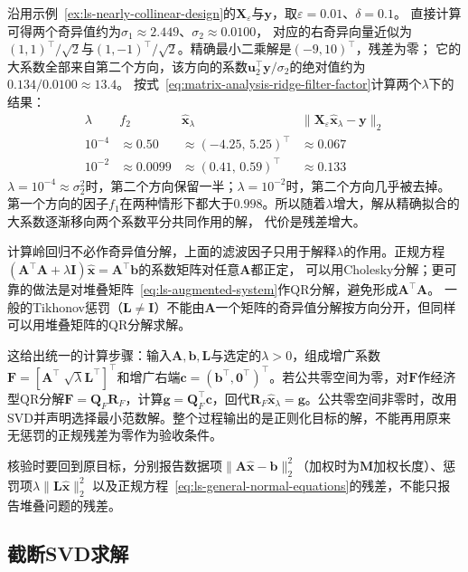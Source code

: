 \begin{example}[近共线设计上的岭回归]
\label{ex:ls-ridge-nearly-collinear}
沿用示例~\ref{ex:ls-nearly-collinear-design}的$\bm X_\varepsilon$与$\bm y$，取$\varepsilon=0.01$、$\delta=0.1$。
直接计算可得两个奇异值约为$\sigma_1\approx2.449$、$\sigma_2\approx0.0100$，
对应的右奇异向量近似为$(1,1)^\top/\sqrt2$与$(1,-1)^\top/\sqrt2$。精确最小二乘解是$(-9,10)^\top$，残差为零；
它的大系数全部来自第二个方向，该方向的系数$\bm u_2^\top\bm y/\sigma_2$的绝对值约为$0.134/0.0100\approx13.4$。
按式~\eqref{eq:matrix-analysis-ridge-filter-factor}计算两个$\lambda$下的结果：
\[
 \begin{array}{cccc}
  \lambda & f_2 & \hat{\bm x}_\lambda & \lVert\bm X_\varepsilon\hat{\bm x}_\lambda-\bm y\rVert_2\\[2pt]
  10^{-4} & \approx0.50 & \approx(-4.25,\,5.25)^\top & \approx0.067\\
  10^{-2} & \approx0.0099 & \approx(0.41,\,0.59)^\top & \approx0.133
 \end{array}
\]
$\lambda=10^{-4}\approx\sigma_2^2$时，第二个方向保留一半；$\lambda=10^{-2}$时，第二个方向几乎被去掉。
第一个方向的因子$f_1$在两种情形下都大于$0.998$。所以随着$\lambda$增大，解从精确拟合的大系数逐渐移向两个系数平分共同作用的解，
代价是残差增大。
\end{example}

计算岭回归不必作奇异值分解，上面的滤波因子只用于解释$\lambda$的作用。正规方程$(\bm A^\top\bm A+\lambda\bm I)\hat{\bm x}=\bm A^\top\bm b$的系数矩阵对任意$\bm A$都正定，
可以用Cholesky分解；更可靠的做法是对堆叠矩阵~\eqref{eq:ls-augmented-system}作QR分解，避免形成$\bm A^\top\bm A$。
一般的Tikhonov惩罚（$\bm L\neq\bm I$）不能由$\bm A$一个矩阵的奇异值分解按方向分开，但同样可以用堆叠矩阵的QR分解求解。

这给出统一的计算步骤：输入$\bm A,\bm b,\bm L$与选定的$\lambda>0$，组成增广系数$\bm F=[\bm A^\top\;\sqrt\lambda\bm L^\top]^\top$和增广右端$\bm c=(\bm b^\top,\bm0^\top)^\top$。若公共零空间为零，对$\bm F$作经济型QR分解$\bm F=\bm Q_F\bm R_F$，计算$\bm g=\bm Q_F^\top\bm c$，回代$\bm R_F\hat{\bm x}_\lambda=\bm g$。公共零空间非零时，改用SVD并声明选择最小范数解。整个过程输出的是正则化目标的解，不能再用原来无惩罚的正规残差为零作为验收条件。

核验时要回到原目标，分别报告数据项$\lVert\bm A\hat{\bm x}-\bm b\rVert_2^2$（加权时为$\bm M$加权长度）、惩罚项$\lambda\lVert\bm L\hat{\bm x}\rVert_2^2$
以及正规方程~\eqref{eq:ls-general-normal-equations}的残差，不能只报告堆叠问题的残差。

\subsection{截断SVD求解}

